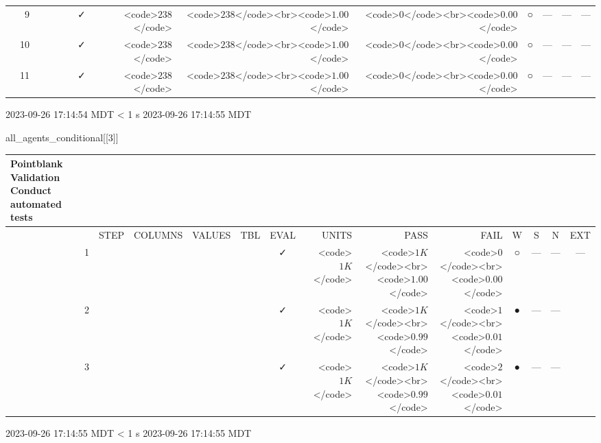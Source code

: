 \documentclass[
  letterpaper,
  DIV=11,
  numbers=noendperiod]{scrreprt}
\newenvironment{Shaded}{\begin{snugshade}}{\end{snugshade}}
\newcommand{\DecValTok}[1]{\textcolor[rgb]{0.68,0.00,0.00}{#1}}
\newcommand{\NormalTok}[1]{\textcolor[rgb]{0.00,0.23,0.31}{#1}}
\begin{document}
\begin{longtable}{lrlllccrrrcccc}
 & 9 &  &  &  &                                                              & ✓ & <code>$238$</code> & <code>$238$</code><br><code>$1.00$</code> & <code>$0$</code><br><code>$0.00$</code> & ○ & --- & --- & --- \\ 
 & 10 &  &  &  &                                                              & ✓ & <code>$238$</code> & <code>$238$</code><br><code>$1.00$</code> & <code>$0$</code><br><code>$0.00$</code> & ○ & --- & --- & --- \\ 
 & 11 &  &  &  &                                                              & ✓ & <code>$238$</code> & <code>$238$</code><br><code>$1.00$</code> & <code>$0$</code><br><code>$0.00$</code> & ○ & --- & --- & --- \\ 
\bottomrule
\end{longtable}
\begin{minipage}{\linewidth}
2023-09-26 17:14:54 MDT
\textless{} 1 s
2023-09-26 17:14:55 MDT\\
\end{minipage}

\begin{Shaded}
\begin{Highlighting}[]
\NormalTok{all\_agents\_conditional[[}\DecValTok{3}\NormalTok{]]}
\end{Highlighting}
\end{Shaded}

\setlength{\LTpost}{0mm}
\begin{longtable}{lrlllccrrrcccc}
\caption*{
{\large Pointblank Validation} \\ 
{\small Conduct automated tests}
} \\ 
\toprule
 &  & STEP & COLUMNS & VALUES & TBL & EVAL & UNITS & PASS & FAIL & W & S & N & EXT \\ 
\midrule
 & 1 &  &  &  &                                                              & ✓ & <code>$1K$</code> & <code>$1K$</code><br><code>$1.00$</code> & <code>$0$</code><br><code>$0.00$</code> & ○ & --- & --- & --- \\ 
 & 2 &  &  &  &                                                              & ✓ & <code>$1K$</code> & <code>$1K$</code><br><code>$0.99$</code> & <code>$1$</code><br><code>$0.01$</code> & ● & --- & --- &  \\ 
 & 3 &  &  &  &                                                              & ✓ & <code>$1K$</code> & <code>$1K$</code><br><code>$0.99$</code> & <code>$2$</code><br><code>$0.01$</code> & ● & --- & --- &  \\ 
\bottomrule
\end{longtable}
\begin{minipage}{\linewidth}
2023-09-26 17:14:55 MDT
\textless{} 1 s
2023-09-26 17:14:55 MDT\\
\end{minipage}
\end{document}
